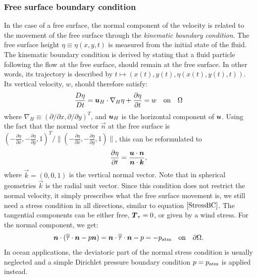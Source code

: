 \subsubsection{Free surface boundary condition}\label{sec:FS}
In the case of a free surface, the normal component of the velocity is related
to the movement of the free surface through the \emph{kinematic boundary
condition}. The free surface height $\eta\equiv\eta(x,y,t)$ is measured from 
the initial state of the fluid. The kinematic boundary condition is derived by
stating that a fluid particle following the flow at the free surface, should
remain at the free surface. In other words, its trajectory is described by
$t\mapsto (x(t), y(t),\eta(x(t),y(t),t))$. Its vertical velocity, $w$, should
therefore satisfy:
\begin{equation} \label{eq:kinematicbc1}
  \frac{D\eta}{Dt}={\mbox{\boldmath$u$}}_H \cdot\nabla_H \eta +
  \frac{\partial\eta}{\partial t} = w \quad \textrm{on}\quad \Omega
\end{equation}
where $\nabla_H\equiv(\partial/\partial x,\partial/\partial y)^T$, and
${\mbox{\boldmath$u$}}_H$ is the horizontal component of ${\mbox{\boldmath$u$}}$.
Using the fact that the normal vector $\vec n$ at the free surface is
$(-\frac{\partial \eta}{\partial x},-\frac{\partial \eta}{\partial y}, 1)^T/
\|(-\frac{\partial \eta}{\partial x},-\frac{\partial \eta}{\partial y}, 1)\|$,
this can be reformulated to
\begin{equation}\label{freesurf3}
\frac{\partial \eta}{\partial t}=\frac{{\mbox{\boldmath$u$}} \cdot {\mbox{\boldmath$n$}}}{{\mbox{\boldmath$n$}} \cdot {\mbox{\boldmath$k$}}},
\end{equation}
where $\vec k=(0,0,1)$ is the vertical normal vector. Note that in spherical
geometries $\vec k$ is the radial unit vector. Since this condition does not
restrict the normal velocity, it simply
prescribes what the free surface movement is, we still need a stress condition
in all directions, similar to equation $\eqref{StressBC}$. The tangential
components can be either free, ${\mbox{\boldmath$T$}}_\tau=0$, or given by a wind stress. For the
normal component, we get:
\begin{equation}
  {\mbox{\boldmath$n$}}\cdot(\overline{\overline{\tau}}\cdot{\mbox{\boldmath$n$}} - p{\mbox{\boldmath$n$}}) = {\mbox{\boldmath$n$}}\cdot\overline{\overline{\tau}}\cdot{\mbox{\boldmath$n$}} - p =
  -p_{\text{atm}} \quad \textrm{on}\quad \partial\Omega.
  \label{NormalStressBC}
\end{equation}
In ocean applications, the deviatoric part of the normal stress condition is
usually neglected and a simple Dirichlet pressure boundary condition $p=p_{\text{atm}}$
is applied instead.

